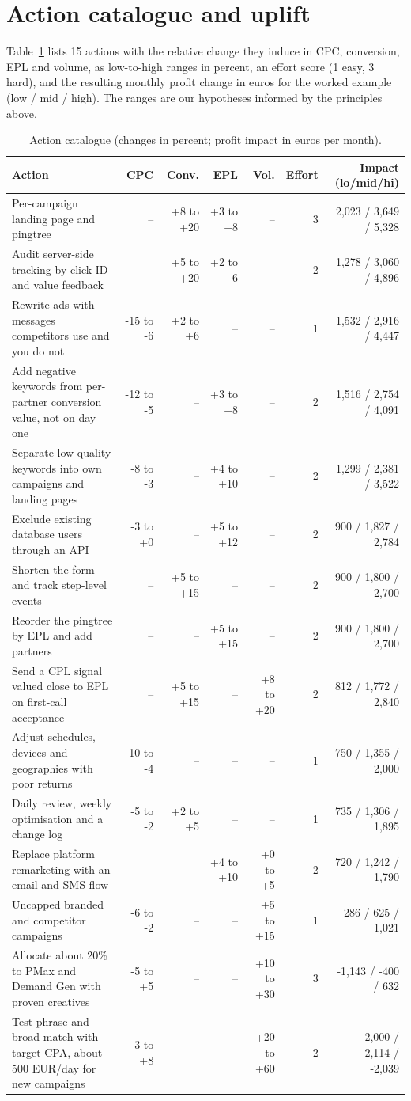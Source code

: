 \documentclass[10pt,a4paper]{article}
\begin{document}
\section{Action catalogue and uplift}
Table~\ref{tab:acts} lists 15 actions with the relative change they induce in CPC, conversion, EPL and volume, as low-to-high ranges in percent, an effort score (1 easy, 3 hard), and the resulting monthly profit change in euros for the worked example (low / mid / high). The ranges are our hypotheses informed by the principles above.
\begin{table}[H]\centering\scriptsize\caption{Action catalogue (changes in percent; profit impact in euros per month).}\label{tab:acts}
\begin{tabular}{p{5.6cm}rrrrrr}\toprule Action & CPC & Conv. & EPL & Vol. & Effort & Impact (lo/mid/hi)\\\midrule
Per-campaign landing page and pingtree & -- & +8 to +20 & +3 to +8 & -- & 3 & 2,023 / 3,649 / 5,328\\
Audit server-side tracking by click ID and value feedback & -- & +5 to +20 & +2 to +6 & -- & 2 & 1,278 / 3,060 / 4,896\\
Rewrite ads with messages competitors use and you do not & -15 to -6 & +2 to +6 & -- & -- & 1 & 1,532 / 2,916 / 4,447\\
Add negative keywords from per-partner conversion value, not on day one & -12 to -5 & -- & +3 to +8 & -- & 2 & 1,516 / 2,754 / 4,091\\
Separate low-quality keywords into own campaigns and landing pages & -8 to -3 & -- & +4 to +10 & -- & 2 & 1,299 / 2,381 / 3,522\\
Exclude existing database users through an API & -3 to +0 & -- & +5 to +12 & -- & 2 & 900 / 1,827 / 2,784\\
Shorten the form and track step-level events & -- & +5 to +15 & -- & -- & 2 & 900 / 1,800 / 2,700\\
Reorder the pingtree by EPL and add partners & -- & -- & +5 to +15 & -- & 2 & 900 / 1,800 / 2,700\\
Send a CPL signal valued close to EPL on first-call acceptance & -- & +5 to +15 & -- & +8 to +20 & 2 & 812 / 1,772 / 2,840\\
Adjust schedules, devices and geographies with poor returns & -10 to -4 & -- & -- & -- & 1 & 750 / 1,355 / 2,000\\
Daily review, weekly optimisation and a change log & -5 to -2 & +2 to +5 & -- & -- & 1 & 735 / 1,306 / 1,895\\
Replace platform remarketing with an email and SMS flow & -- & -- & +4 to +10 & +0 to +5 & 2 & 720 / 1,242 / 1,790\\
Uncapped branded and competitor campaigns & -6 to -2 & -- & -- & +5 to +15 & 1 & 286 / 625 / 1,021\\
Allocate about 20\% to PMax and Demand Gen with proven creatives & -5 to +5 & -- & -- & +10 to +30 & 3 & -1,143 / -400 / 632\\
Test phrase and broad match with target CPA, about 500 EUR/day for new campaigns & +3 to +8 & -- & -- & +20 to +60 & 2 & -2,000 / -2,114 / -2,039\\
\bottomrule\end{tabular}\end{table}
\end{document}
